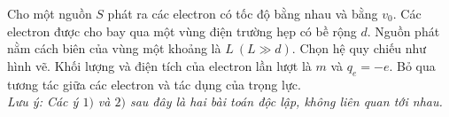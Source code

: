 \begin{vd}
Cho một nguồn ${S}$ phát ra các electron có tốc độ bằng nhau và bằng $v_{0}$. Các electron được cho bay qua một vùng điện trường hẹp có bề rộng $d$. Nguồn phát nằm cách biên của vùng một khoảng là ${L} \ ({L} \gg {d})$. Chọn hệ quy chiếu như hình vẽ. Khối lượng và điện tích của electron lần lượt là
${m}$ và ${q}_{{e}}=-{e}$. Bỏ qua tương tác giữa các electron và tác dụng của trọng lực. 
\\
\textit{Lưu ý: Các ý $1)$ và $2)$ sau đây là hai bài toán độc lập, không liên quan tới nhau.}
\begin{center}

\begin{tikzpicture}[x=0.75pt,y=0.75pt,yscale=-0.8,xscale=0.8]


\end{tikzpicture}
\end{center}
\end{vd}
